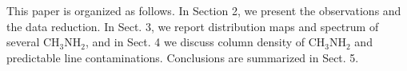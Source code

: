 This paper is organized as follows. 
In Section 2, we present the observations and the data reduction.
In Sect. 3, we report distribution maps and spectrum  of several CH$_3$NH$_2$, 
and in Sect. 4 we discuss column density of CH$_3$NH$_2$ and predictable line contaminations.
Conclusions are summarized in Sect. 5.

